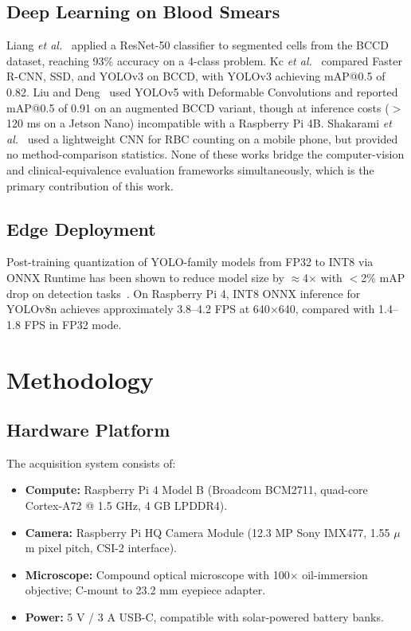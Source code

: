 \documentclass[10pt,conference]{IEEEtran}
\begin{document}
\subsection{Deep Learning on Blood Smears}
Liang \emph{et al.}~\cite{liang2018} applied a ResNet-50 classifier to segmented cells from the BCCD dataset, reaching 93\% accuracy on a 4-class problem. Kc \emph{et al.}~\cite{kc2021} compared Faster R-CNN, SSD, and YOLOv3 on BCCD, with YOLOv3 achieving mAP@0.5 of 0.82. Liu and Deng~\cite{liu2022} used YOLOv5 with Deformable Convolutions and reported mAP@0.5 of 0.91 on an augmented BCCD variant, though at inference costs ($>$120 ms on a Jetson Nano) incompatible with a Raspberry Pi 4B. Shakarami \emph{et al.}~\cite{shakarami2021} used a lightweight CNN for RBC counting on a mobile phone, but provided no method-comparison statistics. None of these works bridge the computer-vision and clinical-equivalence evaluation frameworks simultaneously, which is the primary contribution of this work.

\subsection{Edge Deployment}
Post-training quantization of YOLO-family models from FP32 to INT8 via ONNX Runtime has been shown to reduce model size by $\approx$4$\times$ with $<$2\% mAP drop on detection tasks~\cite{jacob2018}. On Raspberry Pi 4, INT8 ONNX inference for YOLOv8n achieves approximately 3.8–4.2 FPS at 640$\times$640, compared with 1.4–1.8 FPS in FP32 mode.

\section{Methodology}
\label{sec:method}

\subsection{Hardware Platform}
The acquisition system consists of:
\begin{itemize}
  \item \textbf{Compute:} Raspberry Pi 4 Model B (Broadcom BCM2711, quad-core Cortex-A72 @ 1.5 GHz, 4 GB LPDDR4).
  \item \textbf{Camera:} Raspberry Pi HQ Camera Module (12.3 MP Sony IMX477, 1.55 $\mu$m pixel pitch, CSI-2 interface).
  \item \textbf{Microscope:} Compound optical microscope with 100$\times$ oil-immersion objective; C-mount to 23.2 mm eyepiece adapter.
  \item \textbf{Power:} 5 V / 3 A USB-C, compatible with solar-powered battery banks.
\end{itemize}
\end{document}
